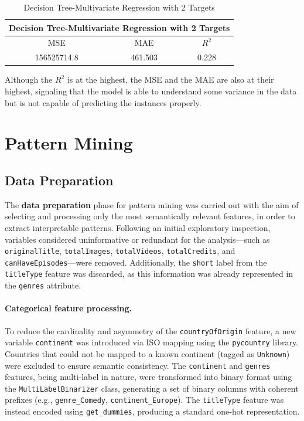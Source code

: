 \documentclass[10pt]{article}
\begin{document}
\begin{table}[h]
    \centering
    \begin{tabular}{|c|c|c|}
    \hline
    \multicolumn{3}{|c|}{Decision Tree-Multivariate Regression with 2 Targets} \\
    \hline
    MSE & MAE & $R^2$ \\
    \hline
    156525714.8 & 461.503 & 0.228 \\
    \hline
    \end{tabular}
    \caption{Decision Tree-Multivariate Regression with 2 Targets}
    \label{table:dt_2t}
\end{table}

Although the $R^2$ is at the highest, the MSE and the MAE are also at their highest, signaling that the model is able to understand some variance in the data but is not capable of predicting the instances properly.

\section{Pattern Mining}
\subsection{Data Preparation}

The \textbf{data preparation} phase for pattern mining was carried out with the aim of selecting and processing only the most semantically relevant features, in order to extract interpretable patterns.
Following an initial exploratory inspection, variables considered uninformative or redundant for the analysis—such as \texttt{originalTitle}, \texttt{totalImages}, \texttt{totalVideos}, \texttt{totalCredits}, and \texttt{canHaveEpisodes}—were removed. Additionally, the \texttt{short} label from the \texttt{titleType} feature was discarded, as this information was already represented in the \texttt{genres} attribute.

\paragraph{Categorical feature processing.}
To reduce the cardinality and asymmetry of the \texttt{countryOfOrigin} feature, a new variable \texttt{continent} was introduced via ISO mapping using the \texttt{pycountry} library. Countries that could not be mapped to a known continent (tagged as \texttt{Unknown}) were excluded to ensure semantic consistency.  
The \texttt{continent} and \texttt{genres} features, being multi-label in nature, were transformed into binary format using the \texttt{MultiLabelBinarizer} class, generating a set of binary columns with coherent prefixes (e.g., \texttt{genre\_Comedy}, \texttt{continent\_Europe}).  
The \texttt{titleType} feature was instead encoded using \texttt{get\_dummies}, producing a standard one-hot representation.
\end{document}
